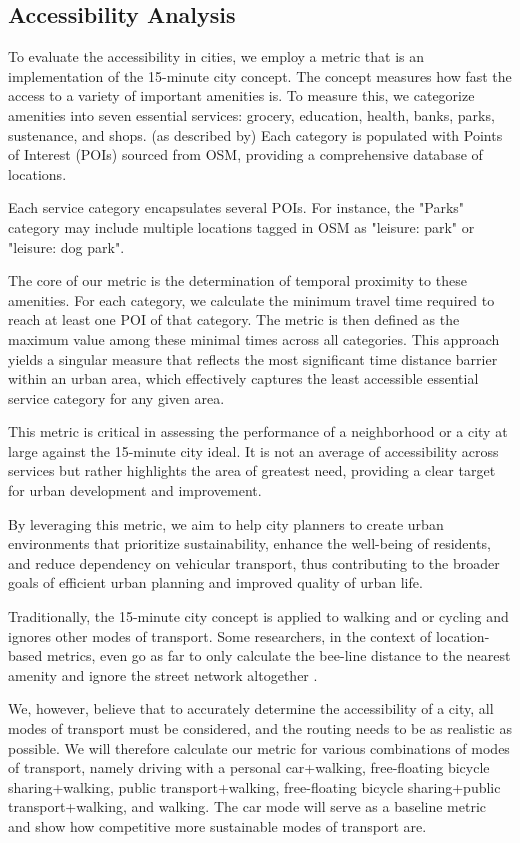 \subsection{Accessibility Analysis}
\label{subs:accessibility_analysis}

To evaluate the accessibility in cities, we employ a metric that is an implementation of the 15-minute city concept. The concept measures how fast the access to a variety of important amenities is.
To measure this, we categorize amenities into seven essential services: grocery, education, health, banks, parks, sustenance, and shops. (as described by)
Each category is populated with Points of Interest (POIs) sourced from OSM, providing a comprehensive database of locations.

Each service category encapsulates several POIs. For instance, the "Parks" category may include multiple locations tagged in OSM as "leisure: park" or "leisure: dog park".

The core of our metric is the determination of temporal proximity to these amenities. 
For each category, we calculate the minimum travel time required to reach at least one POI of that category. 
The metric is then defined as the maximum value among these minimal times across all categories. 
This approach yields a singular measure that reflects the most significant time distance barrier within an urban area, which effectively captures the least accessible essential service category for any given area.

This metric is critical in assessing the performance of a neighborhood or a city at large against the 15-minute city ideal. It is not an average of accessibility across services but rather highlights the area of greatest need, providing a clear target for urban development and improvement.

By leveraging this metric, we aim to help city planners to create urban environments that prioritize sustainability, enhance the well-being of residents, and reduce dependency on vehicular transport, thus contributing to the broader goals of efficient urban planning and improved quality of urban life.

Traditionally, the 15-minute city concept is applied to walking and or cycling and ignores other modes of transport.
Some researchers, in the context of location-based metrics, even go as far to only calculate the bee-line distance to the nearest amenity and ignore the street network altogether \cite{gastnerOptimalDesignSpatial2006}.

We, however, believe that to accurately determine the accessibility of a city, all modes of transport must be considered, and the routing needs to be as realistic as possible.
We will therefore calculate our metric for various combinations of modes of transport, namely driving with a personal car+walking, free-floating bicycle sharing+walking, public transport+walking, free-floating bicycle sharing+public transport+walking, and walking.
The car mode will serve as a baseline metric and show how competitive more sustainable modes of transport are.

